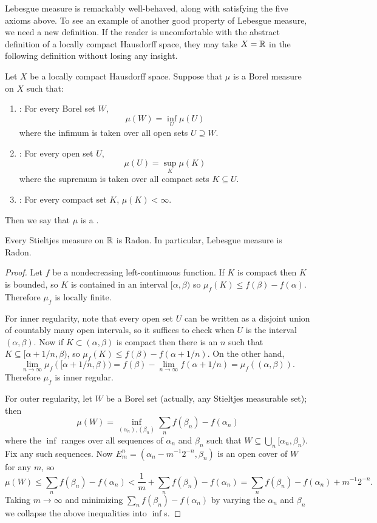 \begin{subsec}
Lebesgue measure is remarkably well-behaved, along with satisfying the five axioms above.
To see an example of another good property of Lebesgue measure, we need a new definition.
If the reader is uncomfortable with the abstract definition of a locally compact Hausdorff space, they may take $X = \mathbb{R}$ in the following definition without losing any insight.
\end{subsec}

\begin{definition}
\label{dfn of radon measure}
Let $X$ be a locally compact Hausdorff space.
Suppose that $\mu$ is a Borel measure on $X$ such that:
\begin{enumerate}
\item {}: For every Borel set $W$,
\[\mu(W) = \inf_U \mu(U)\]
where the infimum is taken over all open sets $U \supseteq W$.
\item {}: For every open set $U$,
\[\mu(U) = \sup_K \mu(K)\]
where the supremum is taken over all compact sets $K \subseteq U$.
\item {}: For every compact set $K$, $\mu(K) < \infty$.
\end{enumerate}
Then we say that $\mu$ is a .
\end{definition}

\begin{theorem}
\label{lebesgue is radon}
Every Stieltjes measure on $\mathbb{R}$ is Radon.
In particular, Lebesgue measure is Radon.
\end{theorem}
\begin{proof}
Let $f$ be a nondecreasing left-continuous function.
If $K$ is compact then $K$ is bounded, so $K$ is contained in an interval $[\alpha, \beta)$ so $\mu_f(K) \leq f(\beta) - f(\alpha)$.
Therefore $\mu_f$ is locally finite.

For inner regularity, note that every open set $U$ can be written as a disjoint union of countably many open intervals, so it suffices to check when $U$ is the interval $(\alpha, \beta)$.
Now if $K \subset (\alpha, \beta)$ is compact then there is an $n$ such that $K \subseteq [\alpha + 1/n, \beta)$, so $\mu_f(K) \leq f(\beta) - f(\alpha + 1/n)$.
On the other hand,
\[\lim_{n \to \infty} \mu_f([\alpha + 1/n, \beta)) = f(\beta) - \lim_{n \to \infty} f(\alpha + 1/n) = \mu_f((\alpha, \beta)).\]
Therefore $\mu_f$ is inner regular.

For outer regularity, let $W$ be a Borel set (actually, any Stieltjes measurable set); then
\[\mu(W) = \inf_{(\alpha_n), (\beta_n)} \sum_n f(\beta_n) - f(\alpha_n)\]
where the $\inf$ ranges over all sequences of $\alpha_n$ and $\beta_n$ such that $W \subseteq \bigcup_n [\alpha_n, \beta_n)$.
Fix any such sequences.
Now $E_m^n = (\alpha_n - m^{-1}2^{-n}, \beta_n)$ is an open cover of $W$ for any $m$, so
\[\mu(W) \leq \sum_n f(\beta_n) - f(\alpha_n) < \frac{1}{m} + \sum_n f(\beta_n) - f(\alpha_n) = \sum_n f(\beta_n) - f(\alpha_n) + m^{-1}2^{-n}.\]
Taking $m \to \infty$ and minimizing $\sum_n f(\beta_n) - f(\alpha_n)$ by varying the $\alpha_n$ and $\beta_n$ we collapse the above inequalities into $\inf$s.
\end{proof}

